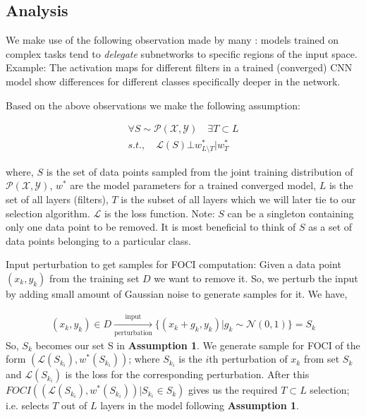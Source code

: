 

\subsection{Analysis}

We make use of the following observation made by many \cite{???}: models trained on complex tasks tend to \textit{delegate} subnetworks to specific regions of the input space. Example: The activation maps for different filters in a trained (converged) CNN model show differences for different classes specifically deeper in the network. 

Based on the above observations we make the following assumption:

\begin{assumption}
\begin{align}
    \forall S \sim \mathcal{P}(\mathcal{X}, \mathcal{Y}) \quad \exists T \subset L \\
    s.t., \quad \mathcal{L}(S) \bot w^{*}_{L\setminus T} | w^{*}_T
\end{align}
\end{assumption}
where, $S$ is the set of data points sampled from the joint training distribution of $\mathcal{P}(\mathcal{X}, \mathcal{Y})$, $w^*$ are the model parameters for a trained converged model, $L$ is the set of all layers (filters), $T$ is the subset of all layers which we will later tie to our selection algorithm. $\mathcal{L}$ is the loss function. 
Note: $S$ can be a singleton containing only one data point to be removed. It is most beneficial to think of $S$ as a set of data points belonging to a particular class. 

Input perturbation to get samples for FOCI computation: Given a data point $(x_k, y_k)$ from the training set $D$ we want to remove it. So, we perturb the input by adding small amount of Gaussian noise to generate samples for it. We have,

\begin{align}
    (x_k, y_k) \in D \xrightarrow[\text{perturbation}]{\text{input}} \{(x_k +g_k, y_k) | g_k \sim \mathcal{N}(0,1)\} = S_k
\end{align}
So, $S_k$ becomes our set S in \textbf{Assumption 1}. We generate sample for FOCI of the form $(\mathcal{L}(S_{k_i}), w^*(S_{k_i}))$; where $S_{k_i}$ is the $i$th perturbation of $x_k$ from set $S_k$ and $\mathcal{L}(S_{k_i})$ is the loss for the corresponding perturbation. 
After this $FOCI({(\mathcal{L}(S_{k_i}), w^*(S_{k_i})) | S_{k_i} \in S_k})$ gives us the required $T \subset L$ selection; i.e. selects $T$ out of $L$ layers in the model following \textbf{Assumption 1}. 

